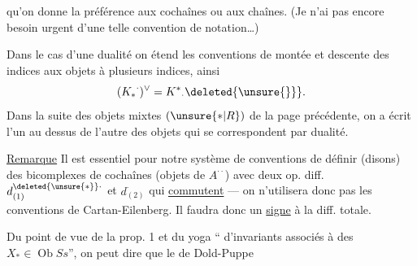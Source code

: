 qu'on donne la préférence aux  cochaînes ou aux chaînes.
(Je n'ai pas encore besoin urgent d'une telle convention de notation\ldots)

Dans le cas d'une dualité
on étend les conventions de montée et descente des indices aux objets à
plusieurs indices, ainsi
\[
 ({K_*}^{\cdot})^\vee={K^*}_{\cdot}\deleted{\unsure{\}}}.
\]
Dans la suite des objets mixtes $(\unsure{*|R})$ de la page précédente,
on a écrit l'un au dessus de l'autre des objets qui se correspondent par dualité.

\uline{Remarque} Il est essentiel pour notre système de conventions de définir
(disons) des bicomplexes de cochaînes (objets de $A^{\cdot\cdot}$) avec deux
op. diff. $d_{(1)}^{\deleted{\unsure{*}}\cdot}$ et $d_{(2)}^{\cdot}$ qui
\uline{commutent} --- on n'utilisera donc pas les conventions de
Cartan-Eilenberg. Il faudra donc un \uline{signe} à la diff. totale.

Du point de vue de la prop. 1 et du yoga 
`` d'invariants associés à des $X_*\in\operatorname{Ob}Ss$'',
on peut dire que le  de Dold-Puppe
